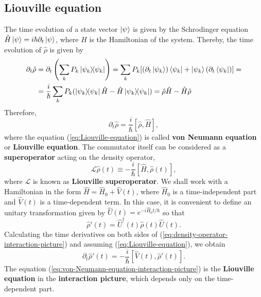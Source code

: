 %
\subsection{Liouville equation}
\label{sec:Liouville-equations}
%

The time evolution of a state vector $ \ket{\psi} $ is given by the Schrodinger equation $ \hat{H} \ket{\psi} = i \hbar \partial_t \ket{\psi} $, where $ \hat{H} $ is the Hamiltonian of the system. Thereby, the time evolution of $ \hat{\rho} $ is given by
\begin{align}
	\partial_t \hat{\rho} &= \partial_t \left( \sum_{k} P_k \ketbra{\psi_k}{\psi_k} \right) = \sum_{k} P_k [(\partial_t \ket{\psi_k})\bra{\psi_k} + \ket{\psi_k}(\partial_t \bra{\psi_k})] = \\
	&= \frac{i}{\hbar} \sum_{k} P_k (\ketbra{\psi_k}{\psi_k} \hat{H} - \hat{H}\ketbra{\psi_k}{\psi_k}) = \hat{\rho}\hat{H} - \hat{H}\hat{\rho}
\end{align}
Therefore,
\begin{equation}
	\partial_t \hat{\rho} = \frac{i}{\hbar} [\hat{\rho}, \hat{H}],
	\label{eq:Liouville-equation}
\end{equation}
where the equation (\ref{eq:Liouville-equation}) is called \textbf{von Neumann equation} or \textbf{Liouville equation}. The commutator itself can be considered as a \textbf{superoperator} acting on the density operator,
\begin{equation}
	\mathcal{L}\hat{\rho}(t) \equiv - \frac{i}{\hbar} [\hat{H}, \hat{\rho}(t)],
	\label{eq:Liouville-superoperator}
\end{equation}
where $ \mathcal{L} $ is known as \textbf{Liouville superoperator}. We shall work with a Hamiltonian in the form $ \hat{H} = \hat{H}_0 + \hat{V}(t) $, where $ \hat{H}_0 $ is a time-independent part and $ \hat{V}(t) $ is a time-dependent term. In this case, it is convenient to define an unitary transformation given by $ \hat{U}(t) = e^{- i \hat{H}_0 t / \hbar} $ so that
\begin{equation}
	\hat{\rho}'(t) = \hat{U}^{\dagger}(t)\hat{\rho}(t)\hat{U}(t).
	\label{eq:density-operator-interaction-picture}
\end{equation}
Calculating the time derivatives on both sides of (\ref{eq:density-operator-interaction-picture}) and assuming (\ref{eq:Liouville-equation}), we obtain
\begin{equation}
	\partial_t \hat{\rho}'(t) = - \frac{i}{\hbar} [\hat{V}(t), \hat{\rho}'(t)].
	\label{eq:von-Neumann-equation-interaction-picture}
\end{equation}
The equation (\ref{eq:von-Neumann-equation-interaction-picture}) is the \textbf{Liouville equation} in the \textbf{interaction picture}, which depends only on the time-dependent part.

